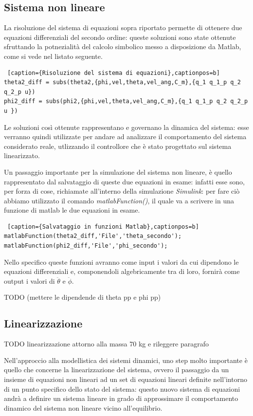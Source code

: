 \subsection{Sistema non lineare}
La risoluzione del sistema di equazioni sopra riportato permette di ottenere due equazioni differenziali del secondo ordine: queste soluzioni sono state ottenute sfruttando la potnezialità del calcolo simbolico messo a disposizione da Matlab, come si vede nel listato seguente.

\begin{lstlisting} [caption={Risoluzione del sistema di equazioni},captionpos=b]
theta2_diff = subs(theta2,{phi,vel,theta,vel_ang,C_m},{q_1 q_1_p q_2 q_2_p u})
phi2_diff = subs(phi2,{phi,vel,theta,vel_ang,C_m},{q_1 q_1_p q_2 q_2_p u })
\end{lstlisting}

Le soluzioni così ottenute rappresentano e governano la dinamica del sistema: esse verranno quindi utilizzate per andare ad analizzare il comportamento del sistema considerato reale, utlizzando il controllore che è stato progettato sul sistema linearizzato.

Un passaggio importante per la simulazione del sistema non lineare, è quello rappresentato dal salvataggio di queste due equazioni in esame: infatti esse sono, per forza di cose, richiamate all'interno della simulazione \textit{Simulink}: per fare ciò abbiamo utilizzato il comando \textit{matlabFunction()}, il quale va a scrivere in una funzione di matlab le due equazioni in esame.

\begin{lstlisting} [caption={Salvataggio in funzioni Matlab},captionpos=b]
matlabFunction(theta2_diff,'File','theta_secondo');
matlabFunction(phi2_diff,'File','phi_secondo');
\end{lstlisting}

Nello specifico queste funzioni avranno come input i valori da cui dipendono le equazioni differenziali e, componendoli algebricamente tra di loro, fornirà come output i valori di $\ddot{\theta}$ e $\ddot{\phi}$.

TODO (mettere le dipendende di theta pp e phi pp)

\subsection{Linearizzazione}
TODO linearizzazione attorno alla massa 70 kg e rileggere paragrafo

Nell'approccio alla modellistica dei sistemi dinamici, uno step molto importante è quello che concerne la linearizzazione del sistema, ovvero il passaggio da un insieme di equazioni non lineari ad un set di equazioni lineari definite nell'intorno di un punto specifico dello stato del sistema: questo nuovo sistema di equazioni andrà a definire un sistema lineare in grado di approssimare il comportamento dinamico del sistema non lineare vicino all'equilibrio.


